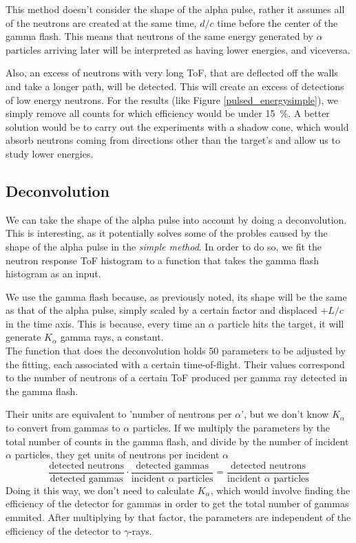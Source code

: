 \documentclass[a4paper,12pt]{report}
\begin{document}
This method doesn't consider the shape of the alpha pulse, rather it assumes all of the neutrons are created at the same time, $d/c$ time before the center of the gamma flash.
This means that neutrons of the same energy generated by $\alpha$ particles arriving later will be interpreted as having lower energies, and viceversa.

Also, an excess of neutrons with very long ToF, that are deflected off the walls and take a longer path, will be detected.
This will create an excess of detections of low energy neutrons.
For the results (like Figure \ref{pulsed_energysimple}), we simply remove all counts for which efficiency would be under \qty{15}{\percent}.
A better solution would be to carry out the experiments with a shadow cone, which would absorb neutrons coming from directions other than the target's and allow us to study lower energies.

\subsection{Deconvolution}
We can take the shape of the alpha pulse into account by doing a deconvolution.
This is interesting, as it potentially solves some of the probles caused by the shape of the alpha pulse in the \textit{simple method}.
In order to do so, we fit the neutron response ToF histogram to a function that takes the gamma flash histogram as an input.

We use the gamma flash because, as previously noted, its shape will be the same as that of the alpha pulse, simply scaled by a certain factor and displaced $+L/c$ in the time axis.
This is because, every time an $\alpha$ particle hits the target, it will generate $K_\alpha$ gamma rays, a constant.
\\

The function that does the deconvolution holds \num{50} parameters to be adjusted by the fitting, each associated with a certain time-of-flight.
Their values correspond to the number of neutrons of a certain ToF produced per gamma ray detected in the gamma flash.

Their units are equivalent to 'number of neutrons per $\alpha$', but we don't know $K_\alpha$ to convert from gammas to $\alpha$ particles.
If we multiply the parameters by the total number of counts in the gamma flash, and divide by the number of incident $\alpha$ particles, they get units of neutrons per incident $\alpha$
\begin{equation}
	\frac{\text{detected neutrons}}{\text{detected gammas}}\cdot \frac{\text{detected gammas}}{\text{incident $\alpha$ particles}} = \frac{\text{detected neutrons}}{\text{incident $\alpha$ particles}}
\end{equation}
Doing it this way, we don't need to calculate $K_\alpha$, which would involve finding the efficiency of the detector for gammas in order to get the total number of gammas emmited.
After multiplying by that factor, the parameters are independent of the efficiency of the detector to $\gamma$-rays.
\\
\end{document}
